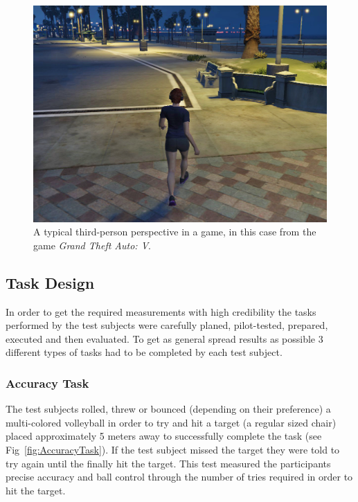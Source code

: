 \documentclass[runningheads,a4paper,oribibl]{llncs}
\begin{document}
\begin{figure}
   \centering
   \includegraphics[width=\textwidth]{ExternalMaterial/GTA}
   \caption{A typical third-person perspective in a game, in this case from the game \emph{Grand Theft Auto: V}. \label{fig:GTAIV}}
\end{figure}









\subsection{Task Design} \label{subsec:TaskDesign}

In order to get the required measurements with high credibility the tasks performed by the test subjects were carefully planed, pilot-tested, prepared, executed and then evaluated. To get as general spread results as possible 3 different types of tasks had to be completed by each test subject.

\subsubsection{Accuracy Task}

The test subjects rolled, threw or bounced (depending on their preference) a multi-colored volleyball in order to try and hit a target (a regular sized chair) placed approximately 5 meters away to successfully complete the task (see Fig~\ref{fig:AccuracyTask}). If the test subject missed the target they were told to try again until the finally hit the target. This test measured the participants precise accuracy and ball control through the number of tries required in order to hit the target.
\end{document}
